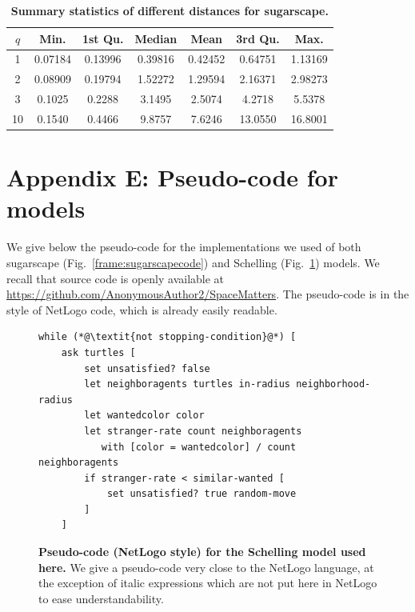 \documentclass{JASSS}
\begin{document}
\begin{table}[!t]
	
	\centering
	\begin{tabular}{|c|cccccc|}
	\hline
    	$q$ & Min. & 1st Qu. & Median & Mean & 3rd Qu. & Max. \\\hline
        1 & 0.07184 & 0.13996 & 0.39816 & 0.42452 & 0.64751 & 1.13169\\
        2 & 0.08909 & 0.19794 & 1.52272 & 1.29594 & 2.16371 & 2.98273\\
        3 & 0.1025 & 0.2288 & 3.1495 & 2.5074 & 4.2718 & 5.5378\\
        10 & 0.1540 & 0.4466 & 9.8757 & 7.6246 & 13.0550 & 16.8001\\\hline
    \end{tabular}
    \caption{\textbf{Summary statistics of different distances for sugarscape.}}\label{tab:sugarscapedistances}
\end{table}





\section{Appendix E: Pseudo-code for models}
\label{app:code}

We give below the pseudo-code for the implementations we used of both sugarscape (Fig.~\ref{frame:sugarscapecode}) and Schelling (Fig.~\ref{frame:schellingcode}) models. We recall that source code is openly available at \url{https://github.com/AnonymousAuthor2/SpaceMatters}. The pseudo-code is in the style of NetLogo code, which is already easily readable.



\begin{figure}[!t]
\caption{\textbf{Pseudo-code (NetLogo style) for the Schelling model used here.} We give a pseudo-code very close to the NetLogo language, at the exception of italic expressions which are not put here in NetLogo to ease understandability.}\label{frame:schellingcode}
\bigskip
\begin{mdframed}
\begin{lstlisting}
while (*@\textit{not stopping-condition}@*) [
	ask turtles [
		set unsatisfied? false
		let neighboragents turtles in-radius neighborhood-radius
		let wantedcolor color
		let stranger-rate count neighboragents
		   with [color = wantedcolor] / count neighboragents
		if stranger-rate < similar-wanted [
			set unsatisfied? true random-move
		]
	]
    \end{lstlisting}
    \end{mdframed}
\end{figure}
\end{document}
